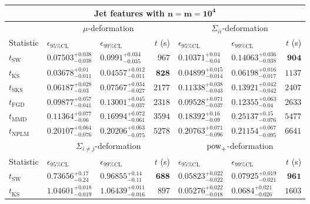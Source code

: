 \begin{tabular}{l|llr|llr}
	\toprule
	\multicolumn{7}{c}{{\bf Jet features with $\mathbf{n=m=10^{4}}$}} \\
	\toprule
	\multicolumn{1}{c}{} & \multicolumn{3}{c}{$\mu$-deformation} & \multicolumn{3}{c}{$\Sigma_{ii}$-deformation} \\
	Statistic & $\epsilon_{95\%\mathrm{CL}}$ & $\epsilon_{99\%\mathrm    {CL}}$ & $t$ (s) & $\epsilon_{95\%\mathrm{CL}}$ & $\epsilon_{99\%\mathrm{CL}}$ & $t$ (s) \\
	\midrule
	$t_{\mathrm{SW}}$ & $0.07503_{-0.038}^{+0.038}$ & $0.0991_{-0.035}^{+0.034}$ & $967$ & $0.10371_{-0.04}^{+0.04}$ & $0.14063_{-0.038}^{+0.036}$ & ${\mathbf{904}}$ \\
	$t_{\overline{\mathrm{KS}}}$ & ${\mathbf{0.03678_{-0.011}^{+0.01}}}$ & ${\mathbf{0.04557_{-0.011}^{+0.012}}}$ & ${\mathbf{828}}$ & ${\mathbf{0.04899_{-0.014}^{+0.015}}}$ & ${\mathbf{0.06198_{-0.017}^{+0.016}}}$ & $1137$ \\
	$t_{\mathrm{SKS}}$ & $0.06187_{-0.03}^{+0.028}$ & $0.07567_{-0.027}^{+0.034}$ & $2177$ & $0.11338_{-0.043}^{+0.038}$ & $0.13921_{-0.042}^{+0.042}$ & $2407$ \\
	$t_{\mathrm{FGD}}$ & $0.09877_{-0.041}^{+0.057}$ & $0.13001_{-0.037}^{+0.045}$ & $2318$ & $0.09528_{-0.037}^{+0.071}$ & $0.12355_{-0.04}^{+0.063}$ & $2633$ \\
	$t_{\mathrm{MMD}}$ & $0.11364_{-0.06}^{+0.077}$ & $0.16994_{-0.061}^{+0.072}$ & $3594$ & $0.18392_{-0.09}^{+0.16}$ & $0.25137_{-0.076}^{+0.15}$ & $5477$ \\
\rowcolor{red!35}	$t_{\mathrm{NPLM}}$ & $0.20107_{-0.076}^{+0.064}$ & $0.20206_{-0.075}^{+0.063}$ & $5278$ & $0.20763_{-0.096}^{+0.071}$ & $0.21154_{-0.095}^{+0.067}$ & $6641$ \\
	\toprule
	\multicolumn{1}{c}{} & \multicolumn{3}{c}{$\Sigma_{i\neq j}$-deformation} & \multicolumn{3}{c}{$\rm{pow}_{+}$-deformation} \\
Statistic & $\epsilon_{95\%\mathrm{CL}}$ & $\epsilon_{99\%\mathrm{CL}}$ & $t$ (s) & $\epsilon_{95\%\mathrm{CL}}$ & $\epsilon_{99\%\mathrm{CL}}$ & $t$ (s) \\
	\midrule
	$t_{\mathrm{SW}}$ & $0.73656_{-0.24}^{+0.17}$ & $0.96855_{-0.11}^{+0.14}$ & ${\mathbf{688}}$ & $0.05823_{-0.022}^{+0.022}$ & $0.07925_{-0.021}^{+0.019}$ & ${\mathbf{961}}$ \\
	$t_{\overline{\mathrm{KS}}}$ & $1.04601_{-0.019}^{+0.018}$ & $1.06439_{-0.016}^{+0.011}$ & $897$ & ${\mathbf{0.05276_{-0.018}^{+0.022}}}$ & $0.0684_{-0.026}^{+0.021}$ & $1603$ \\

\end{tabular}
